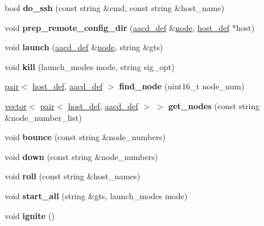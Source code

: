 \begin{DoxyCompactItemize}
\item 
\mbox{\label{structlauncher__def_a016f09fbb85268c29c46e28c1ae06660}} 
bool {\bfseries do\+\_\+ssh} (const string \&cmd, const string \&host\+\_\+name)
\item 
\mbox{\label{structlauncher__def_a94c3a60c08a454e2a19291762276d9f9}} 
void {\bfseries prep\+\_\+remote\+\_\+config\+\_\+dir} (\mbox{\hyperlink{classaacd__def}{aacd\+\_\+def}} \&\mbox{\hyperlink{structnode}{node}}, \mbox{\hyperlink{classhost__def}{host\+\_\+def}} $\ast$host)
\item 
\mbox{\label{structlauncher__def_a2ee45c641e2a8ea06482ca0662ab286f}} 
void {\bfseries launch} (\mbox{\hyperlink{classaacd__def}{aacd\+\_\+def}} \&\mbox{\hyperlink{structnode}{node}}, string \&gts)
\item 
\mbox{\label{structlauncher__def_ae482f4211c61affef1625564844ddcd3}} 
void {\bfseries kill} (launch\+\_\+modes mode, string sig\+\_\+opt)
\item 
\mbox{\label{structlauncher__def_a696de5478091aff9263d31588533210e}} 
\mbox{\hyperlink{structpair}{pair}}$<$ \mbox{\hyperlink{classhost__def}{host\+\_\+def}}, \mbox{\hyperlink{classaacd__def}{aacd\+\_\+def}} $>$ {\bfseries find\+\_\+node} (uint16\+\_\+t node\+\_\+num)
\item 
\mbox{\label{structlauncher__def_a4e4aa086d6c2692077849d587e3d750e}} 
\mbox{\hyperlink{classstd_1_1vector}{vector}}$<$ \mbox{\hyperlink{structpair}{pair}}$<$ \mbox{\hyperlink{classhost__def}{host\+\_\+def}}, \mbox{\hyperlink{classaacd__def}{aacd\+\_\+def}} $>$ $>$ {\bfseries get\+\_\+nodes} (const string \&node\+\_\+number\+\_\+list)
\item 
\mbox{\label{structlauncher__def_a500893d4e0bbd09b4c33bca41fd07790}} 
void {\bfseries bounce} (const string \&node\+\_\+numbers)
\item 
\mbox{\label{structlauncher__def_a0508d513aecd0e758140675d33e65054}} 
void {\bfseries down} (const string \&node\+\_\+numbers)
\item 
\mbox{\label{structlauncher__def_a4a62e759ad911ad59b7d6ca08a72f665}} 
void {\bfseries roll} (const string \&host\+\_\+names)
\item 
\mbox{\label{structlauncher__def_a94d21163ede9d4d2dd2d4b0638a7b4f8}} 
void {\bfseries start\+\_\+all} (string \&gts, launch\+\_\+modes mode)
\item 
\mbox{\label{structlauncher__def_a774763197fe2f2055152f8e80bfbae8e}} 
void {\bfseries ignite} ()
\end{DoxyCompactItemize}

